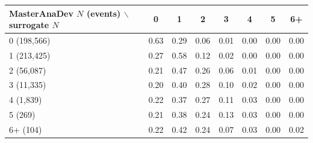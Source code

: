 \begin{tabular}{lccccccc}
\toprule
MasterAnaDev $N$ (events) $\backslash$ surrogate $N$ & 0 & 1 & 2 & 3 & 4 & 5 & 6+ \\
\midrule
0 (198,566) & 0.63 & 0.29 & 0.06 & 0.01 & 0.00 & 0.00 & 0.00 \\
1 (213,425) & 0.27 & 0.58 & 0.12 & 0.02 & 0.00 & 0.00 & 0.00 \\
2 (56,087) & 0.21 & 0.47 & 0.26 & 0.06 & 0.01 & 0.00 & 0.00 \\
3 (11,335) & 0.20 & 0.40 & 0.28 & 0.10 & 0.02 & 0.00 & 0.00 \\
4 (1,839) & 0.22 & 0.37 & 0.27 & 0.11 & 0.03 & 0.00 & 0.00 \\
5 (269) & 0.21 & 0.38 & 0.24 & 0.13 & 0.03 & 0.00 & 0.00 \\
6+ (104) & 0.22 & 0.42 & 0.24 & 0.07 & 0.03 & 0.00 & 0.02 \\
\bottomrule
\end{tabular}
